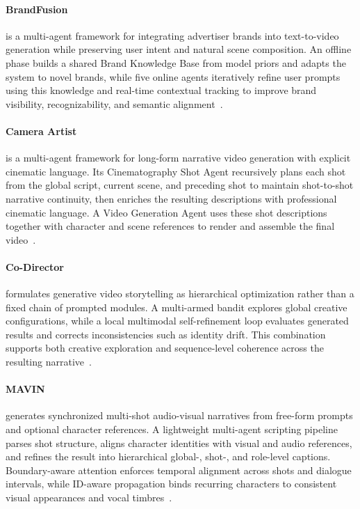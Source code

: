 \paragraph{BrandFusion}
 is a multi-agent framework for integrating advertiser brands into text-to-video generation while preserving user intent and natural scene composition. An offline phase builds a shared Brand Knowledge Base from model priors and adapts the system to novel brands, while five online agents iteratively refine user prompts using this knowledge and real-time contextual tracking to improve brand visibility, recognizability, and semantic alignment~\cite{avg260302816}.

\paragraph{Camera Artist}
 is a multi-agent framework for long-form narrative video generation with explicit cinematic language. Its Cinematography Shot Agent recursively plans each shot from the global script, current scene, and preceding shot to maintain shot-to-shot narrative continuity, then enriches the resulting descriptions with professional cinematic language. A Video Generation Agent uses these shot descriptions together with character and scene references to render and assemble the final video~\cite{avg260409195}.

\paragraph{Co-Director}
 formulates generative video storytelling as hierarchical optimization rather than a fixed chain of prompted modules. A multi-armed bandit explores global creative configurations, while a local multimodal self-refinement loop evaluates generated results and corrects inconsistencies such as identity drift. This combination supports both creative exploration and sequence-level coherence across the resulting narrative~\cite{avg260424842}.

\paragraph{MAVIN}
 generates synchronized multi-shot audio-visual narratives from free-form prompts and optional character references. A lightweight multi-agent scripting pipeline parses shot structure, aligns character identities with visual and audio references, and refines the result into hierarchical global-, shot-, and role-level captions. Boundary-aware attention enforces temporal alignment across shots and dialogue intervals, while ID-aware propagation binds recurring characters to consistent visual appearances and vocal timbres~\cite{avg260629473}.

